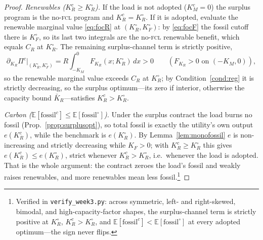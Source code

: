 \documentclass[11pt,reqno]{amsart}
\theoremstyle{plain}
\theoremstyle{definition}
\theoremstyle{remark}
\newcommand{\KR}{K_R}
\newcommand{\KF}{K_F}
\newcommand{\KM}{K_M}
\newcommand{\KRc}{K_R^{c}}
\newcommand{\KMc}{K_M^{c}}
\newcommand{\KRo}{K_R^{\circ}}
\newcommand{\KFo}{K_F^{\circ}}
\newcommand{\CR}{C_R}
\newcommand{\FKR}{F_{\!\KR}}
\newcommand{\E}{\mathbb{E}}
\newcommand{\fossil}{\mathrm{fossil}}
\begin{document}
\begin{proof}
\emph{Renewables ($\KRc\ge\KRo$).} If the load is not adopted ($\KMc=0$) the surplus
program is the no-\textsc{fcl} program and $\KRc=\KRo$. If it is adopted, evaluate the
renewable marginal value \eqref{eq:focR} at $(\KRo,\KFo)$: by \eqref{eq:focF} the fossil
cutoff there is $\KFo$, so its last two integrals are the no-\textsc{fcl} renewable
benefit, which equals $\CR$ at $\KRo$. The remaining surplus-channel term is strictly
positive,
\[
  \partial_{\KR}\Pi^{c}\big|_{(\KRo,\KFo)}=R\!\int_{-\KM}^{0}\!\FKR(x;\KRo)\,dx>0
  \qquad(\FKR>0\text{ on }(-\KM,0)),
\]
so the renewable marginal value exceeds $\CR$ at $\KRo$; by Condition~\ref{cond:reg} it
is strictly decreasing, so the surplus optimum---its zero if interior, otherwise the
capacity bound $\bar K_R$---satisfies $\KRc>\KRo$.

\emph{Carbon ($\E[\fossil^{c}]\le\E[\fossil^{\circ}]$).} Under the surplus contract the
load burns no fossil (Prop.~\ref{prop:surplusopt}), so total fossil is exactly the
utility's own output $e(\KRc)$, while the benchmark is $e(\KRo)$. By
Lemma~\ref{lem:monofossil} $e$ is non-increasing and strictly decreasing while $\KF>0$;
with $\KRc\ge\KRo$ this gives $e(\KRc)\le e(\KRo)$, strict whenever $\KRc>\KRo$, i.e.\
whenever the load is adopted. That is the whole argument: the contract zeroes the load's
fossil and weakly raises renewables, and more renewables mean less fossil.\footnote{Verified
in \texttt{verify\_week3.py}: across symmetric, left- and right-skewed, bimodal, and
high-capacity-factor shapes, the surplus-channel term is strictly positive at $\KRo$,
$\KRc>\KRo$, and $\E[\fossil^{c}]<\E[\fossil^{\circ}]$ at every adopted optimum---the sign
never flips.}
\end{proof}
\end{document}
